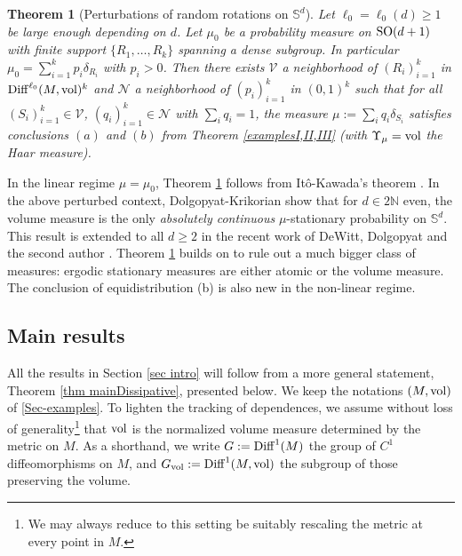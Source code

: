 \documentclass[11pt, leqno, fleqn]{amsart}
\def\SO{   {\rm SO}}
\newcommand{\SectionSymbol}{\textsection}
\def \N{{\mathbb N}}
\newtheorem{thm}{\bf Theorem}[section]
\theoremstyle{definition}
\theoremstyle{definition}
\def\S{ {\mathbb{S}} }
\def \vol{  {\rm vol} }
\newcommand{\Diff}{{\rm Diff}}
\begin{document}
					
				
		\begin{thm}[Perturbations of random rotations on $\S^d$]  \label{thm Sphere}
		Let $\ell_{0}=\ell_{0}(d)\geq 1$ be large enough depending on $d$. Let $\mu_{0}$ be a probability measure on $\SO(d+1)$ with finite support $\{R_{1}, \dots, R_{k}\}$ spanning a dense subgroup. In particular $\mu_{0}=\sum_{i=1}^k p_{i} \delta_{R_{i}}$ with  $p_{i}>0$. Then there exists $\mathcal{V}$ a neighborhood of $(R_{i})_{i=1}^k$ in $\Diff^{\ell_{0}}(M, \vol)^k$ and  $\mathcal{N}$ a neighborhood of $(p_{i})_{i=1}^k$ in $(0, 1)^k$ such that for all  $(S_{i})_{i=1}^k\in \mathcal{V}$, $(q_{i})_{i=1}^k\in \mathcal{N}$ with $\sum_{i}q_{i}=1$,  the measure $\mu:=\sum_{i}q_{i}\delta_{S_{i}}$ satisfies conclusions 
 $(a)$ and $(b)$ from Theorem \ref{examplesI,II,III} (with $\Upsilon_{\mu}=\vol$ the Haar measure).
 \end{thm}

In the linear regime $\mu=\mu_{0}$, Theorem \ref{thm Sphere} follows from It\^o-Kawada's theorem \cite{IK}. 
In the above perturbed context, Dolgopyat-Krikorian \cite{DK} show that for  $d\in 2\N$ even, the volume measure is the only \emph{absolutely continuous} $\mu$-stationary probability on $\S^d$. This result is extended to all $d\geq 2$ in the recent work of  DeWitt, Dolgopyat and the second author \cite{DDZ}.  Theorem \ref{thm Sphere} builds on \cite{DK, DDZ} to rule out a much bigger class of measures: ergodic stationary measures are either atomic or the volume measure. The conclusion of equidistribution  (b) is also new in the non-linear regime. 

		
		
		



 
  

\subsection{Main results} \label{Sec-Mainresults}

All the results in Section \ref{sec intro} will follow from a more general statement, Theorem \ref{thm mainDissipative}, presented below. 
We keep the notations $(M, \vol)$ of \SectionSymbol \ref{Sec-examples}. To lighten the tracking of dependences, we assume without loss of generality\footnote{We may always reduce to this setting be suitably rescaling  the metric at every point in $M$.} 
that $\vol$ is the normalized volume measure determined by the metric on $M$. 
As a shorthand, we write $G := \Diff^1(M)$  the group of  $C^{1}$ diffeomorphisms on $M$, and $G_{\vol} := \Diff^{1}(M, \vol)$  the subgroup of those preserving the volume.
\end{document}
